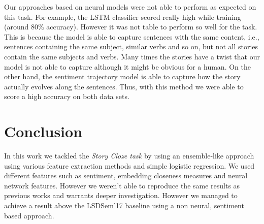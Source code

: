 \documentclass{article}
\newcommand{\lstm}{LSTM }
\begin{document}

Our approaches based on neural models were not able to perform as expected on
this task. For example, the \lstm classifier scored really high while training
(around 80\% accuracy). However it was not table to perform so well for the
task. This is because the model is able to capture sentences with the same
content, i.e., sentences containing the same subject, similar verbs and so on,
but not all stories contain the same subjects and verbs. Many times the stories
have a twist that our model is not able to capture although it might be obvious
for a human. 
On the other hand, the sentiment trajectory model is able to capture how the
story actually evolves along the sentences. Thus, with this method we were
able to score a high accuracy on both data sets.


\section{Conclusion}
In this work we tackled the \textit{Story Cloze task} by using an ensemble-like
approach using various feature extraction methods and simple logistic regression.
We used different features such as sentiment, embedding closeness measures and
neural network features. However we weren't able to reproduce the same results 
as previous works and warrants deeper investigation. However we managed to achieve
a result above the LSDSem'17 baseline using a non neural, sentiment based approach.

\scriptsize


\end{document}
